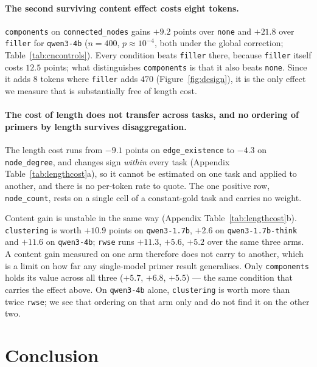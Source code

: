 \documentclass[11pt]{article}
\begin{document}


\paragraph{The second surviving content effect costs eight tokens.}
\texttt{components} on \texttt{connected\_nodes} gains $+9.2$ points over
\texttt{none} and $+21.8$ over \texttt{filler} for \texttt{qwen3-4b}
($n{=}400$, $p\approx10^{-4}$, both under the global correction;
Table~\ref{tab:cncontrols}). Every condition beats \texttt{filler} there,
because \texttt{filler} itself costs $12.5$ points; what distinguishes
\texttt{components} is that it also beats \texttt{none}. Since it adds $8$
tokens where \texttt{filler} adds $470$ (Figure~\ref{fig:design}), it is the
only effect we measure that is substantially free of length cost.

\paragraph{The cost of length does not transfer across tasks, and no
ordering of primers by length survives disaggregation.} The length cost
runs from $-9.1$ points on \texttt{edge\_existence} to $-4.3$ on
\texttt{node\_degree}, and changes sign \emph{within} every task
(Appendix Table~\ref{tab:lengthcost}a), so it cannot be estimated on one
task and
applied to another, and there is no per-token rate to quote. The one
positive row, \texttt{node\_count}, rests on a single cell of a
constant-gold task and carries no weight.

Content gain is unstable in the same way (Appendix
Table~\ref{tab:lengthcost}b).
\texttt{clustering} is worth $+10.9$ points on \texttt{qwen3-1.7b},
$+2.6$ on \texttt{qwen3-1.7b-think} and $+11.6$ on \texttt{qwen3-4b};
\texttt{rwse} runs $+11.3$, $+5.6$, $+5.2$ over the same three arms. A
content gain measured on one arm therefore does not carry to another, which
is a limit on how far any single-model primer result generalises. Only
\texttt{components} holds its value across all three ($+5.7$, $+6.8$,
$+5.5$) --- the same condition that carries the effect above. On
\texttt{qwen3-4b} alone, \texttt{clustering} is worth more than twice
\texttt{rwse}; we see that ordering on that arm only and do not find it on
the other two.

\section{Conclusion}
\label{sec:conclusion}
\end{document}
